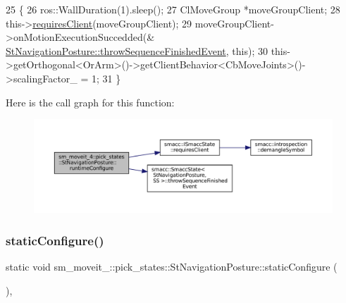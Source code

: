 \begin{DoxyCode}
25     \{
26         ros::WallDuration(1).sleep();
27         ClMoveGroup *moveGroupClient;
28         this->\hyperlink{classsmacc_1_1ISmaccState_a7f95c9f0a6ea2d6f18d1aec0519de4ac}{requiresClient}(moveGroupClient);
29         moveGroupClient->onMotionExecutionSuccedded(&
      \hyperlink{classsmacc_1_1SmaccState_a49dcfc25824f7e083dd4b999c49ab2b6}{StNavigationPosture::throwSequenceFinishedEvent}, \textcolor{keyword}{this});
30         this->getOrthogonal<OrArm>()->getClientBehavior<CbMoveJoints>()->scalingFactor\_ = 1;
31     \}
\end{DoxyCode}
Here is the call graph for this function\+:
\nopagebreak
\begin{figure}[H]
\begin{center}
\leavevmode
\includegraphics[width=350pt]{structsm__moveit__4_1_1pick__states_1_1StNavigationPosture_a224f91484ed745b360dd97c0fef63567_cgraph}
\end{center}
\end{figure}
\mbox{\label{structsm__moveit__4_1_1pick__states_1_1StNavigationPosture_a5b68787c63c17d99ab1e51d8d47b0e9f}} 
\subsubsection{\texorpdfstring{static\+Configure()}{staticConfigure()}}
{\footnotesize\ttfamily static void sm\+\_\+moveit\+\_\+::pick\+\_\+states\+::\+St\+Navigation\+Posture\+::static\+Configure (\begin{DoxyParamCaption}{ }\end{DoxyParamCaption})\hspace{0.3cm}{\ttfamily [inline]}, {\ttfamily [static]}}



